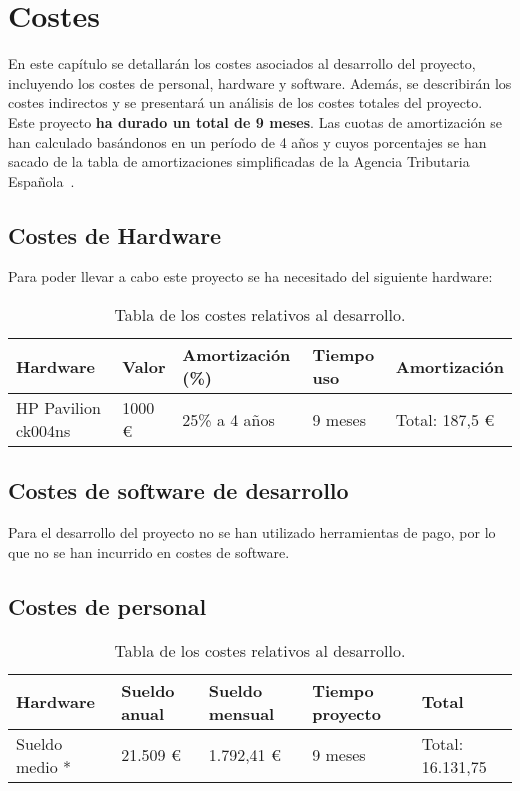 \chapter{Costes}

En este capítulo se detallarán los costes asociados al desarrollo del proyecto, incluyendo los costes de personal, hardware y software. Además, se describirán los costes indirectos y se presentará un análisis de los costes totales del proyecto. Este proyecto \textbf{ha durado un total de 9 meses}. Las cuotas de amortización se han calculado basándonos en un período de 4 años y cuyos porcentajes se han sacado de la tabla de amortizaciones simplificadas de la Agencia Tributaria Española~\cite{agencia2023manual}.

\section{Costes de Hardware}

Para poder llevar a cabo este proyecto se ha necesitado del siguiente hardware:

\begin{table}[H]
  \centering
  \begin{tabular}{|l|l|l|l|l|}
    \hline
    \textbf{Hardware}   & \textbf{Valor} & \textbf{Amortización (\%)} & \textbf{Tiempo uso} & \textbf{Amortización} \\ \hline
    HP Pavilion ck004ns & 1000 €         & 25\% a 4 años              & 9 meses             & Total: 187,5 €        \\ \hline
  \end{tabular}
  \caption{Tabla de los costes relativos al desarrollo.}
  \label{table:1}
\end{table}

\section{Costes de software de desarrollo}

Para el desarrollo del proyecto no se han utilizado herramientas de pago, por lo que no se han incurrido en costes de software.

\section{Costes de personal}

\begin{table}[H]
  \centering
  \begin{tabular}{|l|l|l|l|l|}
    \hline
    \textbf{Hardware} & \textbf{Sueldo anual} & \textbf{Sueldo mensual} & \textbf{Tiempo proyecto} & \textbf{Total}   \\ \hline
    Sueldo medio *    & 21.509 €              & 1.792,41 €              & 9 meses                  & Total: 16.131,75 \\ \hline
  \end{tabular}
  \caption{Tabla de los costes relativos al desarrollo.}
  \label{table:1}
\end{table}

